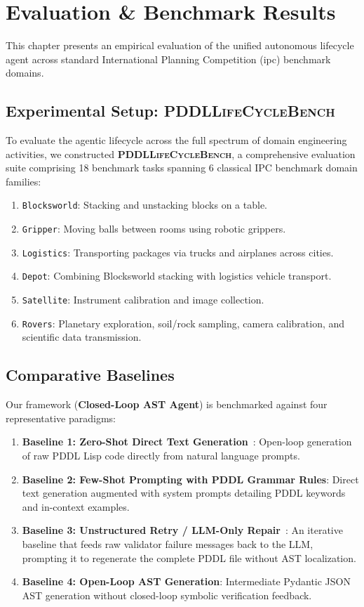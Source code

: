 \chapter{Evaluation \& Benchmark Results}
\label{chap:evaluation}

This chapter presents an empirical evaluation of the unified autonomous lifecycle agent across standard International Planning Competition (\gls{ipc}) benchmark domains.

\section{Experimental Setup: \textsc{PDDLLifeCycleBench}}
To evaluate the agentic lifecycle across the full spectrum of domain engineering activities, we constructed \textbf{\textsc{PDDLLifeCycleBench}}, a comprehensive evaluation suite comprising 18 benchmark tasks spanning 6 classical IPC benchmark domain families:
\begin{enumerate}
    \item \texttt{Blocksworld}: Stacking and unstacking blocks on a table.
    \item \texttt{Gripper}: Moving balls between rooms using robotic grippers.
    \item \texttt{Logistics}: Transporting packages via trucks and airplanes across cities.
    \item \texttt{Depot}: Combining Blocksworld stacking with logistics vehicle transport.
    \item \texttt{Satellite}: Instrument calibration and image collection.
    \item \texttt{Rovers}: Planetary exploration, soil/rock sampling, camera calibration, and scientific data transmission.
\end{enumerate}

\section{Comparative Baselines}
Our framework (\textbf{Closed-Loop AST Agent}) is benchmarked against four representative paradigms:
\begin{enumerate}
    \item \textbf{Baseline 1: Zero-Shot Direct Text Generation}~\cite{oswald2024}: Open-loop generation of raw PDDL Lisp code directly from natural language prompts.
    \item \textbf{Baseline 2: Few-Shot Prompting with PDDL Grammar Rules}: Direct text generation augmented with system prompts detailing PDDL keywords and in-context examples.
    \item \textbf{Baseline 3: Unstructured Retry / LLM-Only Repair}~\cite{bavandpour2026llmonly}: An iterative baseline that feeds raw validator failure messages back to the LLM, prompting it to regenerate the complete PDDL file without AST localization.
    \item \textbf{Baseline 4: Open-Loop AST Generation}: Intermediate Pydantic JSON AST generation without closed-loop symbolic verification feedback.
\end{enumerate}

